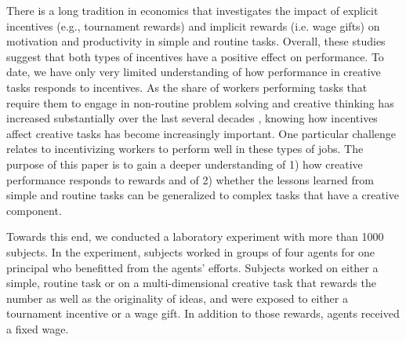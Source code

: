 
There is a long tradition in economics that investigates 
the impact of explicit incentives (e.g., tournament rewards) and implicit rewards (i.e. wage gifts) 
on motivation and productivity 
in simple and routine tasks. Overall, these studies suggest that both types of incentives 
have a positive effect on performance.
To date, we have only very limited understanding of how performance in creative tasks responds to incentives.
As the share of workers performing tasks that require them to engage in non-routine problem solving 
and creative thinking has increased substantially 
over the last several decades \citep{Autor03QJE,Florida2002}, knowing how incentives affect creative tasks
has become increasingly important. 
 One 
particular challenge relates to incentivizing workers 
to perform well in these types of jobs. 
The purpose of this paper is to gain a deeper understanding of 1) how creative performance responds 
to rewards and of 2) whether 
the lessons learned from simple and routine tasks can be generalized to complex tasks 
that have a creative component.   


Towards this end, we conducted a laboratory experiment with more than 1000 subjects. In the experiment, 
subjects worked in groups of four agents for one principal who benefitted from the agents' efforts. 
Subjects
 worked on either a simple, routine task or on a multi-dimensional creative task that 
rewards the number as well as the originality of ideas, and were exposed to either a tournament 
incentive or a wage gift. In addition to those rewards, agents received a fixed wage.


